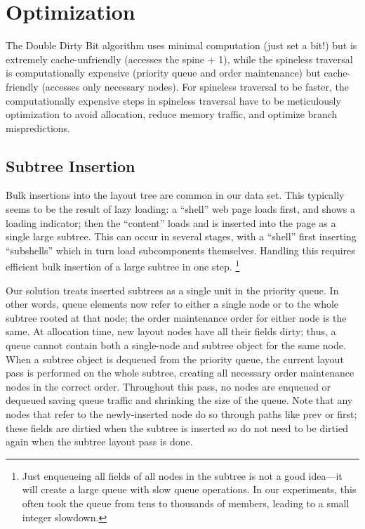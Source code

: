 \section{Optimization}
The Double Dirty Bit algorithm uses minimal computation (just set a bit!)
  but is extremely cache-unfriendly (accesses the spine + 1),
  while the spineless traversal is computationally expensive
  (priority queue and order maintenance)
  but cache-friendly (accesses only necessary nodes).
For spineless traversal to be faster,
  the computationally expensive steps in spineless traversal
  have to be meticulously optimization
  to avoid allocation, reduce memory traffic,
  and optimize branch mispredictions.

\subsection{Subtree Insertion}
\label{sec:tree-insertion}
Bulk insertions into the layout tree are common in our data set.
This typically seems to be the result of lazy loading:
  a ``shell'' web page loads first, and shows a loading indicator;
  then the ``content'' loads and is inserted into the page
  as a single large subtree.
This can occur in several stages, with a ``shell''
  first inserting ``subshells'' which in turn load subcomponents themselves.
Handling this requires
  efficient bulk insertion of a large subtree in one step.%
\footnote{
  Just enqueueing all fields of all nodes in the subtree
    is not a good idea---it will create a large queue with slow queue operations.
  In our experiments, this often took the queue
    from tens to thousands of members, leading to a small integer slowdown.
}

Our solution treats inserted subtrees as a single unit in the priority queue.
In other words, queue elements now refer to either a single node
  or to the whole subtree rooted at that node;
  the order maintenance order for either node is the same.
At allocation time, new layout nodes have all their fields dirty;
  thus, a queue cannot contain both a single-node and subtree object
  for the same node.
When a subtree object is dequeued from the priority queue,
  the current layout pass is performed on the whole subtree,
  creating all necessary order maintenance nodes in the correct order.
Throughout this pass, no nodes are enqueued or dequeued
  saving queue traffic and shrinking the size of the queue.
Note that any nodes that refer to the newly-inserted node
  do so through paths like \textsf{prev} or \textsf{first};
  these fields are dirtied when the subtree is inserted
  so do not need to be dirtied again
  when the subtree layout pass is done.

